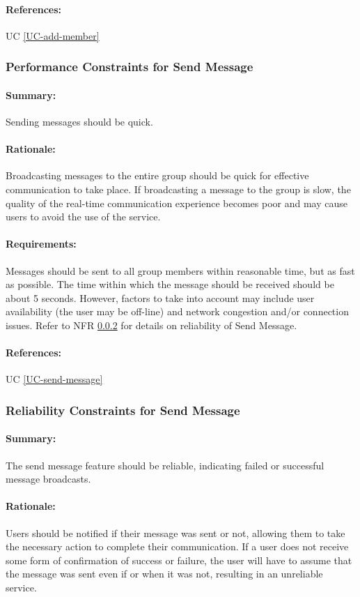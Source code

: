 \documentclass[11pt]{article}
\begin{document}
\paragraph{References:} UC \ref{UC-add-member}

\subsubsection{Performance Constraints for Send Message} \label{NFR-performance-send-message}
\paragraph{Summary:} Sending messages should be quick.
\paragraph{Rationale:} Broadcasting messages to the entire group should be quick for effective communication to take place. If broadcasting a message to the group is slow, the quality of the real-time communication experience becomes poor and may cause users to avoid the use of the service. 
\paragraph{Requirements:} Messages should be sent to all group members within reasonable time, but as fast as possible. The time within which the message should be received should be about 5 seconds. However, factors to take into account may include user availability (the user may be off-line) and network congestion and/or connection issues. Refer to NFR \ref{NFR-reliability-send-message} for details on reliability of Send Message.
\paragraph{References:} UC \ref{UC-send-message}

\subsubsection{Reliability Constraints for Send Message} \label{NFR-reliability-send-message}
\paragraph{Summary:} The send message feature should be reliable, indicating failed or successful message broadcasts.
\paragraph{Rationale:} Users should be notified if their message was sent or not, allowing them to take the necessary action to complete their communication. If a user does not receive some form of confirmation of success or failure, the user will have to assume that the message was sent even if or when it was not, resulting in an unreliable service.
\end{document}
